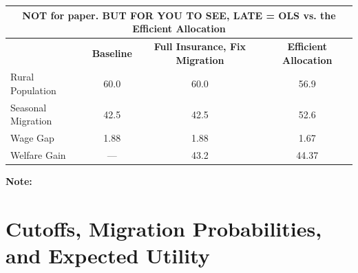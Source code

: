 \documentclass[12pt,pdftex]{article}
\renewcommand{\arraystretch}{1.1}
\begin{document}
\begin{onehalfspacing}
\begin{table}[h!]
\small
\setlength {\tabcolsep}{1.5mm}
\renewcommand{\arraystretch}{2.30}
\begin{center}\label{tb:effecient}
\begin{tabular}{l c c c }
\multicolumn{4}{c}{\normalsize \textbf{NOT for paper. BUT FOR YOU TO SEE, LATE = OLS vs. the Efficient Allocation}}\\
\hline
\hline
\footnotesize   & \footnotesize  \textbf{Baseline} & \footnotesize   \textbf{Full Insurance, Fix Migration} &  \footnotesize \textbf{Efficient Allocation} \\
\cmidrule(lr){2-2} \cmidrule(lr){3-3} \cmidrule(lr){4-4}
\footnotesize  Rural Population  & 60.0  & 60.0   & 56.9      \\
\footnotesize  Seasonal Migration & 42.5   & 42.5 & 52.6 \\
\footnotesize  Wage Gap  & 1.88  & 1.88  & 1.67     \\
\footnotesize Welfare Gain & --- & 43.2 & 44.37 \\
\hline
\end{tabular}
\parbox[c]{6.75in}{\vspace{.1cm}
{\footnotesize \textbf{Note:} }}
\end{center}
\end{table}


\newpage



\newpage

\appendix

\section{Cutoffs, Migration Probabilities, and Expected Utility}\label{appendix:migration_probs}




\end{onehalfspacing}
\end{document}
